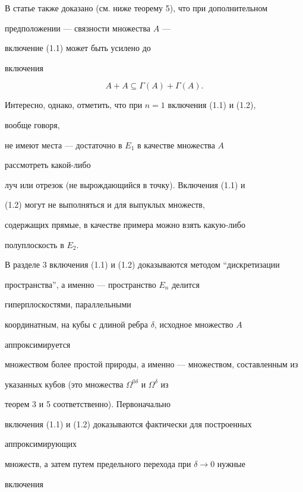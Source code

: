  


В статье также доказано (см. ниже теорему 5), что при дополнительном 


предположении --- связности множества $A$ --- 


включение (1.1) может быть усилено до 


включения 


\begin{equation} 


A+A\subseteq\Gamma(A)+\Gamma(A). 


\end{equation} 


 


Интересно, однако, отметить, что при $n=1$ включения (1.1) и (1.2), 


вообще говоря, 


не имеют места --- достаточно в $E_1$ в качестве множества $A$ 


рассмотреть какой-либо 


луч или отрезок (не вырождающийся в точку). Включения (1.1) и 


(1.2) могут не выполняться и для выпуклых множеств,


содержащих прямые, в качестве примера можно взять какую-либо


полуплоскость в $E_2$. 


 


В разделе 3 включения (1.1) и (1.2) доказываются методом ``дискретизации 


пространства'', а именно --- пространство $E_n$ делится 


гиперплоскостями, параллельными 


координатным, на кубы с длиной ребра $\delta$, исходное множество $A$ 


аппроксимируется 


множеством более простой природы, а именно --- множеством, составленным из 


указанных кубов (это множества $\Omega^{0\delta}$ и $\Omega^\delta$ из 


теорем 3 и 5 соответственно). Первоначально 


включения (1.1) и (1.2) доказываются фактически для построенных 


аппроксимирующих 


множеств, а затем путем предельного перехода при $\delta\to0$ нужные 


включения 


